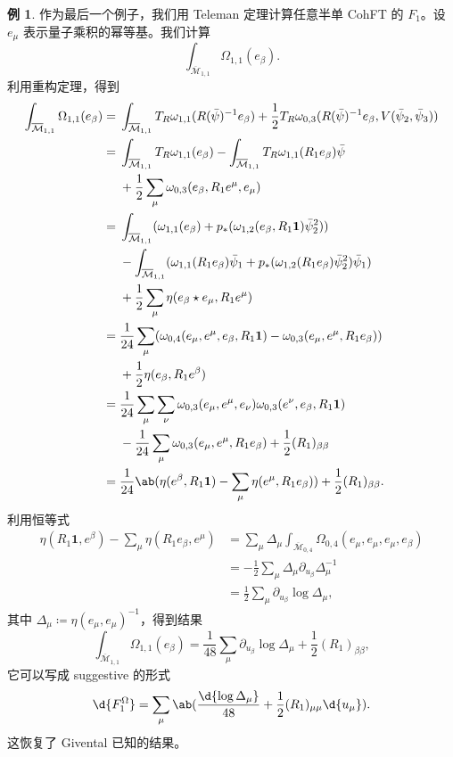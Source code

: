 \documentclass{amsart}
\theoremstyle{definition}
\newtheorem{exm}[thm]{例}
\theoremstyle{remark}
\theoremstyle{plain}
\theoremstyle{definition}
\theoremstyle{remark}
\newcommand{\Mbar}{\overline{\mathcal{M}}}
\newcommand{\1}{\mathbf{1}}
\newcommand{\2}{\mathbf{2}}
\newcommand{\3}{\mathbf{3}}
\begin{document}
\begin{exm}
    作为最后一个例子，我们用 Teleman 定理计算任意半单 CohFT 的 \(F_1\)。设 \(e_{\mu}\) 表示量子乘积的幂等基。我们计算
    \[ \int_{\Mbar_{1,1}} \Omega_{1,1}(e_{\beta}). \]
    利用重构定理，得到
    \begin{align*}
        \int_{\Mbar_{1,1}}\Omega_{1,1}(e_{\beta}) ={}& \int_{\Mbar_{1,1}} T_R \omega_{1,1}(R(\bar{\psi})^{-1} e_{\beta}) + \frac{1}{2} T_R \omega_{0,3}(R(\bar{\psi})^{-1} e_{\beta}, V(\bar{\psi}_2, \bar{\psi}_3)) \\
        ={}& \int_{\Mbar_{1,1}}T_R\omega_{1,1}(e_{\beta}) - \int_{\Mbar_{1,1}} T_R \omega_{1,1}(R_1 e_{\beta})\bar{\psi} \\ 
        &+ \frac{1}{2}\sum_{\mu}  \omega_{0,3}(e_{\beta}, R_1 e^{\mu}, e_{\mu}) \\
        ={}& \int_{\Mbar_{1,1}} ( \omega_{1,1}(e_{\beta}) + p_* ( \omega_{1,2}(e_{\beta}, R_1 \1) \bar{\psi}_2^2 )) \\
        &- \int_{\Mbar_{1,1}} (\omega_{1,1}(R_1 e_{\beta})\bar{\psi}_1 + p_* ( \omega_{1,2}(R_1 e_{\beta}) \bar{\psi}_2^2 ) \bar{\psi}_1) \\
        &+ \frac{1}{2} \sum_{\mu} \eta(e_{\beta} \star e_{\mu}, R_1 e^{\mu}) \\
        ={}& \frac{1}{24} \sum_{\mu} ( \omega_{0,4}(e_{\mu}, e^{\mu}, e_{\beta}, R_1 \1) -\omega_{0,3}(e_{\mu}, e^{\mu}, R_1 e_{\beta}) )\\
        &+ \frac{1}{2} \eta(e_{\beta}, R_1 e^{\beta}) \\
        ={}& \frac{1}{24} \sum_{\mu}\sum_{\nu} \omega_{0,3}(e_{\mu}, e^{\mu}, e_{\nu})\omega_{0,3}(e^{\nu}, e_{\beta}, R_1 \1) \\
        &-\frac{1}{24} \sum_{\mu} \omega_{0,3}(e_{\mu}, e^{\mu}, R_1 e_{\beta}) + \frac{1}{2} (R_1)_{\beta\beta} \\
        ={}& \frac{1}{24} \ab(\eta(e^{\beta}, R_1 \1) - \sum_{\mu} \eta(e^{\mu}, R_1 e_{\beta})) + \frac{1}{2} (R_1)_{\beta\beta}.
    \end{align*}
    利用恒等式
    \begin{align*}
        \eta(R_1 \1, e^{\beta}) - \sum_{\mu} \eta(R_1 e_{\beta}, e^{\mu}) &= \sum_{\mu} \Delta_{\mu} \int_{\Mbar_{0,4}} \Omega_{0,4}(e_{\mu}, e_{\mu}, e_{\mu}, e_{\beta}) \\
        &= -\frac{1}{2}\sum_{\mu} \Delta_{\mu} \partial_{u_{\beta}} \Delta_{\mu}^{-1} \\
        &= \frac{1}{2} \sum_{\mu} \partial_{u_{\beta}} \log \Delta_{\mu},
    \end{align*}
    其中 \(\Delta_{\mu} \coloneqq \eta(e_{\mu}, e_{\mu})^{-1}\)，得到结果
    \[ \int_{\Mbar_{1,1}} \Omega_{1,1}(e_{\beta}) = \frac{1}{48} \sum_{\mu} \partial_{u_{\beta}} \log \Delta_{\mu} + \frac{1}{2} (R_1)_{\beta\beta}, \]
    它可以写成 suggestive 的形式
    \[ \d{F_1^{\Omega}} = \sum_{\mu} \ab( \frac{\d{\log \Delta_{\mu}}}{48} + \frac{1}{2} (R_1)_{\mu\mu} \d{u_{\mu}} ). \]
    这恢复了 Givental 已知的结果。
\end{exm}
\end{document}
